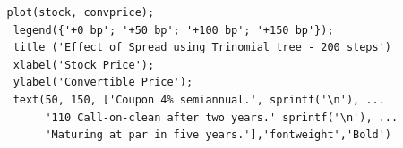 \documentclass[compress]{beamer}
\begin{document}
\begin{frame}[fragile]
 \begin{columns}
 \column{1.5in}
\lstset{language=Matlab,basicstyle=\tiny}
	\begin{lstlisting}
   plot(stock, convprice);
    legend({'+0 bp'; '+50 bp'; '+100 bp'; '+150 bp'});
    title ('Effect of Spread using Trinomial tree - 200 steps')
    xlabel('Stock Price');
    ylabel('Convertible Price');
    text(50, 150, ['Coupon 4% semiannual.', sprintf('\n'), ...
         '110 Call-on-clean after two years.' sprintf('\n'), ...
         'Maturing at par in five years.'],'fontweight','Bold')
 	\end{lstlisting}
 	
  \column{2.8in}
\begin{center}
\end{center}

\end{columns}
\end{frame}
\end{document}
